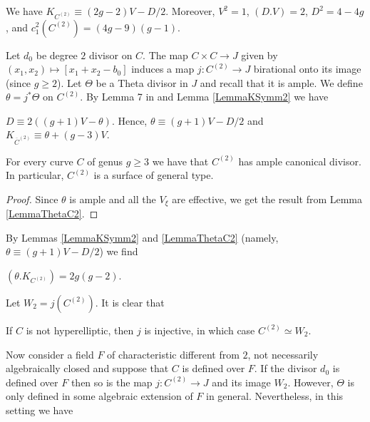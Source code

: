 \begin{lemma}
\notready\label{LemmaKSymm2} We have $K_{C^{(2)}}\equiv (2g-2)V-D/2$. Moreover, $V^2=1$, $(D.V)=2$, $D^2=4-4g$, and $c_1^2(C^{(2)})=(4g-9)(g-1)$.
\end{lemma}


Let $d_0$ be degree $2$ divisor on $C$. The map $C\times C\to J$ given by $(x_1,x_2)\mapsto [x_1+x_2-b_0]$ induces a  map $j:C^{(2)}\to J$ birational onto its image (since $g\ge 2$). Let $\Theta$ be a Theta divisor in $J$ and recall that it is ample.  We define $\theta=j^*\Theta$ on $C^{(2)}$. By Lemma 7 in \cite{KouvidakisTAMS93} and Lemma \ref{LemmaKSymm2} we have

 \begin{lemma}
\notready\label{LemmaThetaC2} $D\equiv 2((g+1)V-\theta)$. Hence, $\theta\equiv (g+1)V-D/2$ and $K_{\overline{C}^{(2)}}\equiv \theta + (g-3)V$.
\end{lemma}

\begin{corollary}
\notready \label{LemmaSymm2GT} For every curve $C$ of genus $g\ge 3$  we have that $C^{(2)}$ has ample canonical divisor. In particular, $C^{(2)}$ is a surface of general type.
\end{corollary}
\begin{proof} Since $\theta$ is ample and all the $V_{\xi}$ are effective, we get the result from Lemma \ref{LemmaThetaC2}.
\end{proof}


By Lemmas \ref{LemmaKSymm2} and \ref{LemmaThetaC2} (namely, $\theta\equiv (g+1)V-D/2$) we find

\begin{lemma}
\notready\label{LemmaThetaK} $(\theta.K_{C^{(2)}})=2g(g-2)$.
\end{lemma}


Let $W_2=j(C^{(2)})$. It is clear that

\begin{lemma}
\notready\label{LemmanonHypEll} If $C$ is not hyperelliptic, then $j$ is injective, in which case $C^{(2)}\simeq W_2$.
\end{lemma}

Now consider a field $F$ of characteristic different from $2$, not necessarily algebraically closed and suppose that $C$ is defined over $F$. If the divisor $d_0$ is defined over $F$ then so is the map $j:C^{(2)}\to J$ and its image $W_2$. However, $\Theta$ is only defined in some algebraic extension of $F$ in general. Nevertheless, in this setting we have

